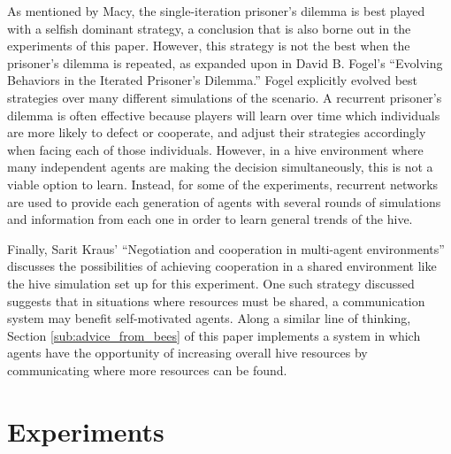 \documentclass[twoside]{article}
\begin{document}
\begin{multicols}{2}
	As mentioned by Macy, the single-iteration prisoner's dilemma is best played with a selfish dominant strategy, a conclusion that is also borne out in the experiments of this paper. However, this strategy is not the best when the prisoner's dilemma is repeated, as expanded upon in David B. Fogel's ``Evolving Behaviors in the Iterated Prisoner's Dilemma.'' \cite{fogel}  Fogel explicitly evolved best strategies over many different simulations of the scenario. A recurrent prisoner's dilemma is often effective because players will learn over time which individuals are more likely to defect or cooperate, and adjust their strategies accordingly when facing each of those individuals. However, in a hive environment where many independent agents are making the decision simultaneously, this is not a viable option to learn. Instead, for some of the experiments, recurrent networks are used to provide each generation of agents with several rounds of simulations and information from each one in order to learn general trends of the hive.

	Finally, Sarit Kraus' ``Negotiation and cooperation in multi-agent environments'' discusses the possibilities of achieving cooperation in a shared environment like the hive simulation set up for this experiment. \cite{kraus} One such strategy discussed suggests that in situations where resources must be shared, a communication system may benefit self-motivated agents. Along a similar line of thinking, Section \ref{sub:advice_from_bees} of this paper implements a system in which agents have the opportunity of increasing overall hive resources by communicating where more resources can be found. 



	\section{Experiments} %
	\label{sec:experiments}


\end{multicols}
\end{document}
